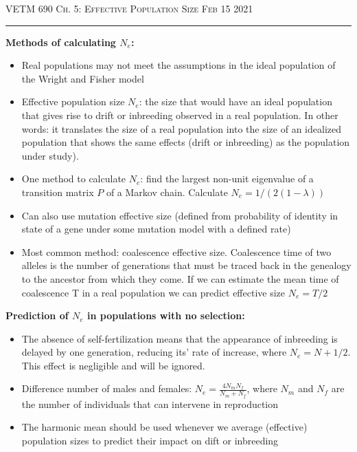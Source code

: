 \documentclass[12pt]{amsart}
\begin{document}
\thispagestyle{empty}

{\scshape VETM 690} \hfill {\scshape \Large  Ch. 5: Effective Population Size} \hfill {\scshape Feb 15 2021}
 
\medskip

\hrule

\bigskip

\bigskip

{\large \bf Methods of calculating $N_e$:}

\begin{itemize}
\item  Real populations may not meet the assumptions in the ideal population of the Wright and Fisher model
\item Effective population size $N_e$: the size that would have an ideal population that gives rise to drift or inbreeding observed in a real population. In other words: it translates the size of a real population into the size of an idealized population that shows the same effects (drift or inbreeding) as the population under study). 
\item One method to calculate $N_e$: find the largest non-unit eigenvalue of a transition matrix $P$ of a Markov chain. Calculate $N_e = 1/(2(1-\lambda))$
\item Can also use mutation effective size (defined from probability of identity in state of a gene under some mutation model with a defined rate)
\item Most common method: coalescence effective size. Coalescence time of two alleles is the number of generations that must be traced back in the genealogy to the ancestor from which they come. If we can estimate the mean time of coalescence T in a real population we can predict effective size $N_e = T/2$
\end{itemize}
{\large \bf Prediction of $N_e$ in populations with no selection:}
\begin{itemize}
\item The absence of self-fertilization means that the appearance of inbreeding is delayed by one generation, reducing its' rate of increase, where $N_e = N + 1/2$. This effect is negligible and will be ignored.
\item Difference number of males and females: $N_e = \frac{4N_mN_f}{N_m + N_f}$, where $N_m$ and $N_f$ are the number of individuals that can intervene in reproduction
\item The harmonic mean should be used whenever we average (effective) population sizes to predict their impact on dift or inbreeding
\end{itemize}
\end{document}
